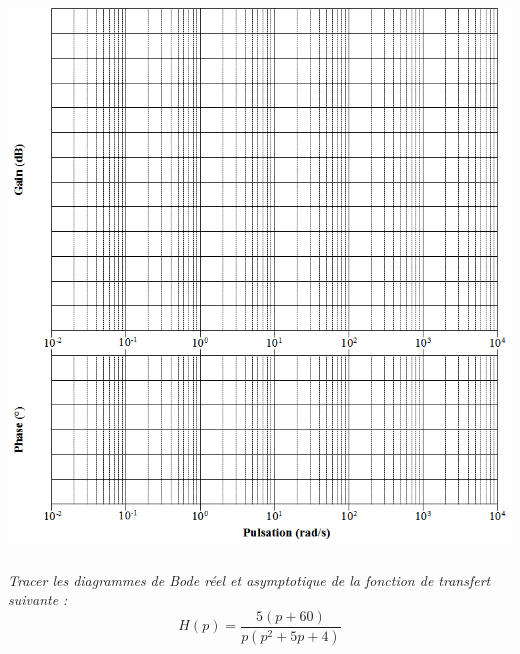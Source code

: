 \documentclass[10pt,fleqn]{article} %
\begin{document}
\begin{multicols}{2}
\else
\begin{center}
\includegraphics[width=\linewidth]{images/img_04}
\end{center}
\fi

\subparagraph{}
\textit{Tracer les diagrammes de Bode réel et asymptotique de la fonction de transfert suivante : }
$$
H(p)=\dfrac{5(p+60)}{p(p^2+5p+4)}
$$


\ifprof
\begin{corrige} ~\\


\end{corrige}
\end{multicols}
\end{document}
